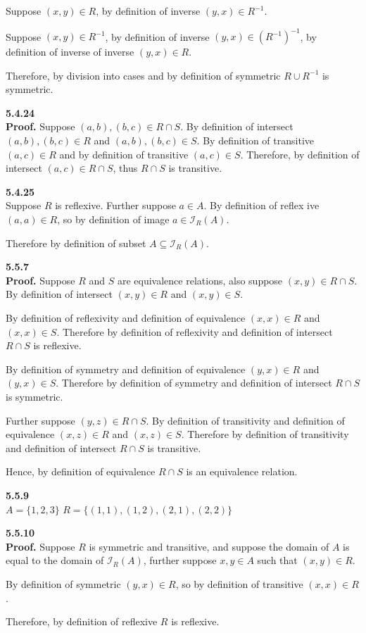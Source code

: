 \documentclass[12pt]{article}
\newcommand{\image}[2]{\mathcal{I}_{#1}(#2)}
\begin{document}
    Suppose $(x, y)\in R$, by definition of inverse $(y, x)\in R^{-1}$.

    Suppose $(x, y)\in R^{-1}$, by definition of inverse $(y, x)\in(R^{-1})^{-1}$, by definition of inverse of
    inverse $(y, x)\in R$.

    Therefore, by division into cases and by definition of symmetric $R\cup R^{-1}$ is symmetric.

    \medskip
    \noindent
    \textbf{5.4.24}\\
    \textbf{Proof.} Suppose $(a, b),(b,c)\in R\cap S$.
    By definition of intersect $(a, b),(b,c)\in R$ and $(a, b),(b, c)\in S$.
    By definition of transitive $(a, c)\in R$ and by definition of transitive $(a, c)\in S$.
    Therefore, by definition of intersect $(a, c)\in R\cap S$, thus $R\cap S$ is transitive.

    \medskip
    \noindent
    \textbf{5.4.25}\\
    Suppose $R$ is reflexive.
    Further suppose $a\in A$.
    By definition of reflex ive $(a, a)\in R$, so by definition of image $a\in\image{R}{A}$.

    Therefore by definition of subset $A\subseteq\image{R}{A}$.

    \medskip
    \noindent
    \textbf{5.5.7}\\
    \textbf{Proof.} Suppose $R$ and $S$ are equivalence relations, also suppose $(x,y)\in R\cap S$.
    By definition of intersect $(x,y)\in R$ and $(x, y)\in S$.

    By definition of reflexivity and definition of equivalence $(x,x)\in R$ and $(x, x)\in S$.
    Therefore by definition of reflexivity and definition of intersect $R\cap S$ is reflexive.

    By definition of symmetry and definition of equivalence $(y,x)\in R$ and $(y,x)\in S$.
    Therefore by definition of symmetry and definition of intersect $R\cap S$ is symmetric.

    Further suppose $(y, z)\in R\cap S$.
    By definition of transitivity and definition of equivalence $(x, z)\in R$ and $(x, z)\in S$.
    Therefore by definition of transitivity and definition of intersect $R\cap S$ is transitive.

    Hence, by definition of equivalence $R\cap S$ is an equivalence relation.

    \medskip
    \noindent
    \textbf{5.5.9}\\
    $A=\{1, 2, 3\}$
    $R=\{(1, 1), (1, 2), (2, 1), (2, 2)\}$

    \medskip
    \noindent
    \textbf{5.5.10}\\
    \textbf{Proof.} Suppose $R$ is symmetric and transitive, and suppose the domain of $A$ is equal to the domain of
    $\image{R}{A}$, further suppose $x, y\in A$ such that $(x, y)\in R$.

    By definition of symmetric $(y,x)\in R$, so by definition of transitive $(x,x)\in R$.

    Therefore, by definition of reflexive $R$ is reflexive.
\end{document}
